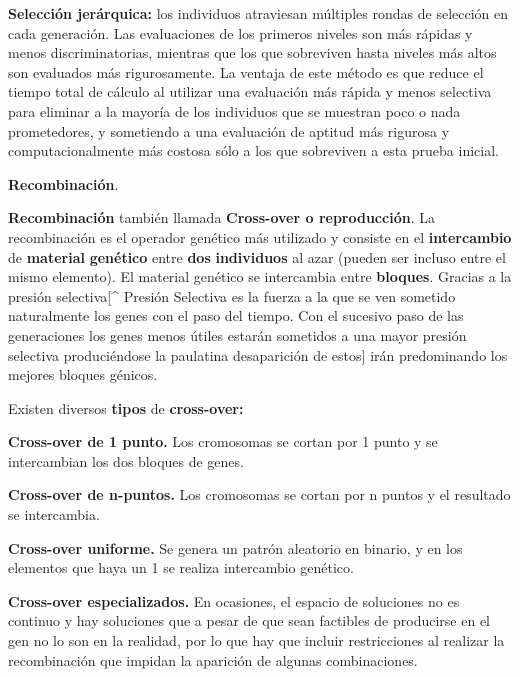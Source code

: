 \documentclass[
  a4paper,
  DIV=11,
  numbers=noendperiod]{scrreprt}
\begin{document}
\textbf{Selección jerárquica:} los individuos atraviesan múltiples
rondas de selección en cada generación. Las evaluaciones de los primeros
niveles son más rápidas y menos discriminatorias, mientras que los que
sobreviven hasta niveles más altos son evaluados más rigurosamente. La
ventaja de este método es que reduce el tiempo total de cálculo al
utilizar una evaluación más rápida y menos selectiva para eliminar a la
mayoría de los individuos que se muestran poco o nada prometedores, y
sometiendo a una evaluación de aptitud más rigurosa y computacionalmente
más costosa sólo a los que sobreviven a esta prueba inicial.

\textbf{Recombinación}.

\textbf{Recombinación} también llamada \textbf{Cross-over o
reproducción}. La recombinación es el operador genético más utilizado y
consiste en el \textbf{intercambio} de \textbf{material}
\textbf{genético} entre \textbf{dos} \textbf{individuos} al azar (pueden
ser incluso entre el mismo elemento). El material genético se
intercambia entre \textbf{bloques}. Gracias a la presión
selectiva{[}\^{} Presión Selectiva es la fuerza a la que se ven sometido
naturalmente los genes con el paso del tiempo. Con el sucesivo paso de
las generaciones los genes menos útiles estarán sometidos a una mayor
presión selectiva produciéndose la paulatina desaparición de estos{]}
irán predominando los mejores bloques génicos.

Existen diversos \textbf{tipos} de \textbf{cross-over:}

\textbf{Cross-over de 1 punto.} Los cromosomas se cortan por 1 punto y
se intercambian los dos bloques de genes.

\textbf{Cross-over de n-puntos.} Los cromosomas se cortan por n puntos y
el resultado se intercambia.

\textbf{Cross-over uniforme.} Se genera un patrón aleatorio en binario,
y en los elementos que haya un 1 se realiza intercambio genético.

\textbf{Cross-over especializados.} En ocasiones, el espacio de
soluciones no es continuo y hay soluciones que a pesar de que sean
factibles de producirse en el gen no lo son en la realidad, por lo que
hay que incluir restricciones al realizar la recombinación que impidan
la aparición de algunas combinaciones.
\end{document}
